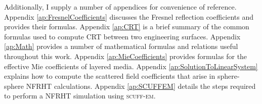 Additionally, I supply a number of appendices for convenience of reference. Appendix \ref{ap:FresnelCoefficients} discusses the Fresnel reflection coefficients and provides their formulas. Appendix \ref{ap:CRT} is a brief summary of the common formulas used to compute CRT between two engineering surfaces. Appendix \ref{ap:Math} provides a number of mathematical formulas and relations useful throughout this work. Appendix \ref{ap:MieCoefficients} provides formulas for the effective Mie coefficients of layered media. Appendix \ref{ap:SolutionToLinearSystem} explains how to compute the scattered field coefficients that arise in sphere-sphere NFRHT calculations. Appendix \ref{ap:SCUFFEM} details the steps required to perform a NFRHT simulation using \textsc{scuff-em}.